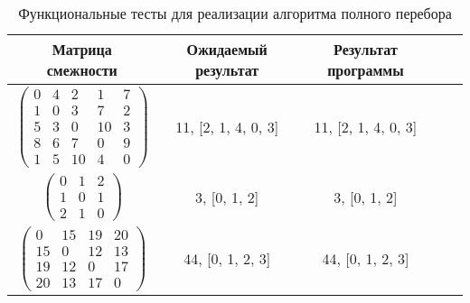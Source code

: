 \begin{center}
	\captionsetup{justification=raggedright,singlelinecheck=off}
	\begin{longtable}[c]{|c|c|c|c|c|}
		\caption{Функциональные тесты для реализации алгоритма полного перебора\label{tbl:functional_test}} \\ \hline
		Матрица смежности & Ожидаемый результат & Результат программы \\
		\hline
		$ \begin{pmatrix}
			0 &  4 &  2 &  1 & 7 \\
			1 &  0 &  3 &  7 & 2 \\
			5 &  3 &  0 & 10 & 3 \\
			8 &  6 & 7 &  0 & 9 \\
			1 &  5 &  10 &  4 & 0
		\end{pmatrix}$ &
		11, [2, 1, 4, 0, 3] &
		11, [2, 1, 4, 0, 3] \\

		$ \begin{pmatrix}
			0 & 1 & 2 \\
			1 & 0 & 1 \\
			2 & 1 & 0
		\end{pmatrix}$ &
		3, [0, 1, 2] &
		3, [0, 1, 2] \\

		$ \begin{pmatrix}
			0 & 15 & 19 & 20 \\
			15 &  0 & 12 & 13 \\
			19 & 12 &  0 & 17 \\
			20 & 13 & 17 &  0
		\end{pmatrix}$ &
		44, [0, 1, 2, 3] &
		44, [0, 1, 2, 3] \\
		\hline
	\end{longtable}
\end{center}

\clearpage

